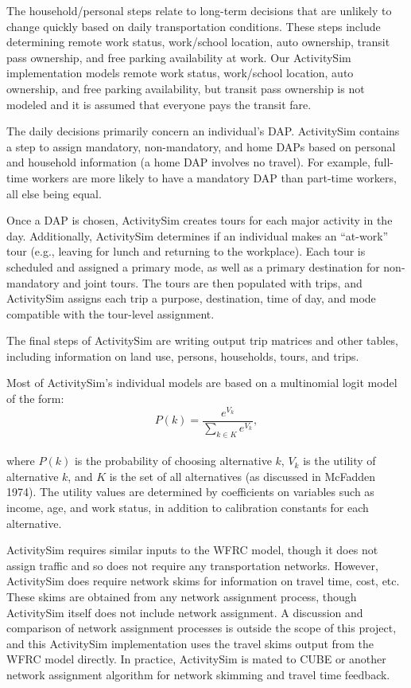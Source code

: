 \documentclass[fancy, oneside, mastersfancy, ms]{byuthesis}
\begin{document}
The household/personal steps relate to long-term decisions that are
unlikely to change quickly based on daily transportation conditions.
These steps include determining remote work status, work/school
location, auto ownership, transit pass ownership, and free parking
availability at work. Our ActivitySim implementation models remote work
status, work/school location, auto ownership, and free parking
availability, but transit pass ownership is not modeled and it is
assumed that everyone pays the transit fare.

The daily decisions primarily concern an individual's DAP. ActivitySim
contains a step to assign mandatory, non-mandatory, and home DAPs based
on personal and household information (a home DAP involves no travel).
For example, full-time workers are more likely to have a mandatory DAP
than part-time workers, all else being equal.

Once a DAP is chosen, ActivitySim creates tours for each major activity
in the day. Additionally, ActivitySim determines if an individual makes
an ``at-work'' tour (e.g., leaving for lunch and returning to the
workplace). Each tour is scheduled and assigned a primary mode, as well
as a primary destination for non-mandatory and joint tours. The tours
are then populated with trips, and ActivitySim assigns each trip a
purpose, destination, time of day, and mode compatible with the
tour-level assignment.

The final steps of ActivitySim are writing output trip matrices and
other tables, including information on land use, persons, households,
tours, and trips.

Most of ActivitySim's individual models are based on a multinomial logit
model of the form:\\
\[
P(k) = \frac{e^{V_k}}{\displaystyle \sum_{k \in K} e^{V_k}},
\]\\
where \(P(k)\) is the probability of choosing alternative \(k\), \(V_k\)
is the utility of alternative \(k\), and \(K\) is the set of all
alternatives (as discussed in McFadden 1974). The utility values are
determined by coefficients on variables such as income, age, and work
status, in addition to calibration constants for each alternative.

ActivitySim requires similar inputs to the WFRC model, though it does
not assign traffic and so does not require any transportation networks.
However, ActivitySim does require network skims for information on
travel time, cost, etc. These skims are obtained from any network
assignment process, though ActivitySim itself does not include network
assignment. A discussion and comparison of network assignment processes
is outside the scope of this project, and this ActivitySim
implementation uses the travel skims output from the WFRC model
directly. In practice, ActivitySim is mated to CUBE or another network
assignment algorithm for network skimming and travel time feedback.
\end{document}
